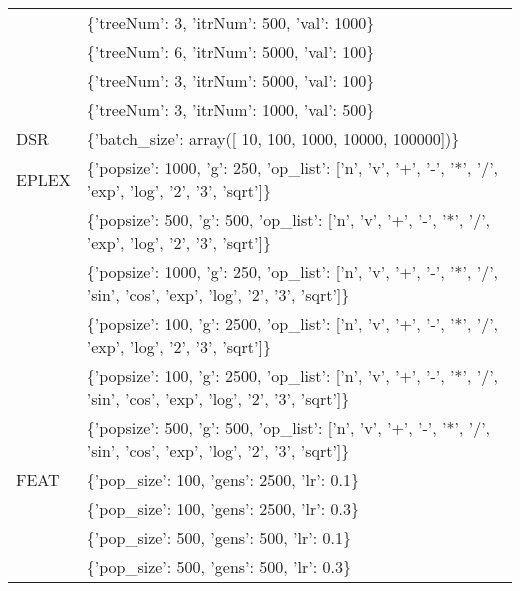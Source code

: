 \begin{tabular}{l p{37em}}
          &                                                                           \{'treeNum': 3, 'itrNum': 500, 'val': 1000\} \\
          &                                                                           \{'treeNum': 6, 'itrNum': 5000, 'val': 100\} \\
          &                                                                           \{'treeNum': 3, 'itrNum': 5000, 'val': 100\} \\
          &                                                                           \{'treeNum': 3, 'itrNum': 1000, 'val': 500\} \\
\midrule
      DSR &                                                      \{'batch\_size': array([    10,    100,   1000,  10000, 100000])\} \\
\midrule
    EPLEX &               \{'popsize': 1000, 'g': 250, 'op\_list': ['n', 'v', '+', '-', '*', '/', 'exp', 'log', '2', '3', 'sqrt']\} \\
          &                \{'popsize': 500, 'g': 500, 'op\_list': ['n', 'v', '+', '-', '*', '/', 'exp', 'log', '2', '3', 'sqrt']\} \\
          & \{'popsize': 1000, 'g': 250, 'op\_list': ['n', 'v', '+', '-', '*', '/', 'sin', 'cos', 'exp', 'log', '2', '3', 'sqrt']\} \\
          &               \{'popsize': 100, 'g': 2500, 'op\_list': ['n', 'v', '+', '-', '*', '/', 'exp', 'log', '2', '3', 'sqrt']\} \\
          & \{'popsize': 100, 'g': 2500, 'op\_list': ['n', 'v', '+', '-', '*', '/', 'sin', 'cos', 'exp', 'log', '2', '3', 'sqrt']\} \\
          &  \{'popsize': 500, 'g': 500, 'op\_list': ['n', 'v', '+', '-', '*', '/', 'sin', 'cos', 'exp', 'log', '2', '3', 'sqrt']\} \\
\midrule
     FEAT &                                                                           \{'pop\_size': 100, 'gens': 2500, 'lr': 0.1\} \\
          &                                                                           \{'pop\_size': 100, 'gens': 2500, 'lr': 0.3\} \\
          &                                                                            \{'pop\_size': 500, 'gens': 500, 'lr': 0.1\} \\
          &                                                                            \{'pop\_size': 500, 'gens': 500, 'lr': 0.3\} \\

\end{tabular}
